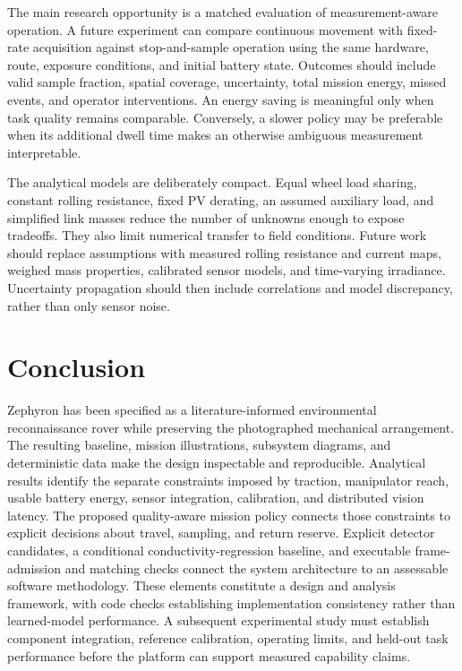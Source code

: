 \documentclass[11pt,letterpaper]{article}
\begin{document}
The main research opportunity is a matched evaluation of measurement-aware operation. A future experiment can compare continuous movement with fixed-rate acquisition against stop-and-sample operation using the same hardware, route, exposure conditions, and initial battery state. Outcomes should include valid sample fraction, spatial coverage, uncertainty, total mission energy, missed events, and operator interventions. An energy saving is meaningful only when task quality remains comparable. Conversely, a slower policy may be preferable when its additional dwell time makes an otherwise ambiguous measurement interpretable.

The analytical models are deliberately compact. Equal wheel load sharing, constant rolling resistance, fixed PV derating, an assumed auxiliary load, and simplified link masses reduce the number of unknowns enough to expose tradeoffs. They also limit numerical transfer to field conditions. Future work should replace assumptions with measured rolling resistance and current maps, weighed mass properties, calibrated sensor models, and time-varying irradiance. Uncertainty propagation should then include correlations and model discrepancy, rather than only sensor noise.

\FloatBarrier
\section{Conclusion}

Zephyron has been specified as a literature-informed environmental reconnaissance rover while preserving the photographed mechanical arrangement. The resulting baseline, mission illustrations, subsystem diagrams, and deterministic data make the design inspectable and reproducible. Analytical results identify the separate constraints imposed by traction, manipulator reach, usable battery energy, sensor integration, calibration, and distributed vision latency. The proposed quality-aware mission policy connects those constraints to explicit decisions about travel, sampling, and return reserve. Explicit detector candidates, a conditional conductivity-regression baseline, and executable frame-admission and matching checks connect the system architecture to an assessable software methodology. These elements constitute a design and analysis framework, with code checks establishing implementation consistency rather than learned-model performance. A subsequent experimental study must establish component integration, reference calibration, operating limits, and held-out task performance before the platform can support measured capability claims.

\FloatBarrier

\end{document}
